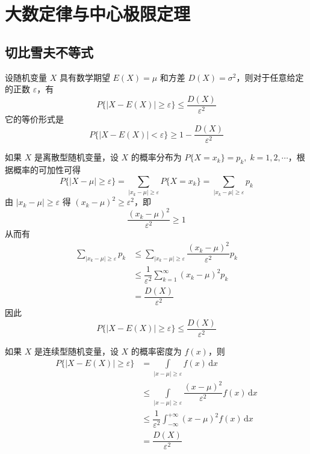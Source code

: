 
\chapter{大数定律与中心极限定理}

\section{切比雪夫不等式}

\begin{theorem}[（切比雪夫不等式）]
    设随机变量 $X$ 具有数学期望 $E(X)=\mu$ 和方差 $D(X) = \sigma^2$，则对于任意给定的正数 $\varepsilon$，有
    $$
    P\{ |X-E(X)| \geqslant \varepsilon \} \leqslant \dfrac{D(X)}{\varepsilon^2}
    $$
    它的等价形式是
    $$
    P\{ |X-E(X)| < \varepsilon \} \geqslant 1 - \dfrac{D(X)}{\varepsilon^2}
    $$
\end{theorem}

\begin{myproof}
    如果 $X$ 是离散型随机变量，设 $X$ 的概率分布为 $P\{X = x_k\} = p_k, \; k=1,2,\cdots$，根据概率的可加性可得
    $$
    P\{ |X-\mu| \geqslant \varepsilon \} = \sum_{|x_k-\mu| \geqslant \varepsilon} P\{ X=x_k \} = \sum_{|x_k-\mu| \geqslant \varepsilon} p_k
    $$
    由 $|x_k-\mu| \geqslant \varepsilon$ 得 $(x_k-\mu)^2 \geqslant \varepsilon^2$，即
    $$
    \dfrac{(x_k-\mu)^2}{\varepsilon^2} \geqslant 1
    $$
    从而有
    $$
    \begin{aligned}
        \sum_{|x_k-\mu| \geqslant \varepsilon} p_k & \leqslant \sum_{|x_k-\mu| \geqslant \varepsilon} \dfrac{(x_k-\mu)^2}{\varepsilon^2} p_k \\
        & \leqslant \dfrac{1}{\varepsilon^2} \sum_{k=1}^{\infty} (x_k-\mu)^2 p_k \\
        &= \dfrac{D(X)}{\varepsilon^2}
    \end{aligned}
    $$
    因此
    $$
    P\{ |X-E(X)| \geqslant \varepsilon \} \leqslant \dfrac{D(X)}{\varepsilon^2}
    $$

    如果 $X$ 是连续型随机变量，设 $X$ 的概率密度为 $f(x)$，则
    $$
    \begin{aligned}
        P\{ |X-E(X)| \geqslant \varepsilon \} &= \underset{|x-\mu| \geqslant \varepsilon}{\int} f(x) \, \text{d}x \\
         & \leqslant \underset{|x-\mu| \geqslant \varepsilon}{\int} \dfrac{(x-\mu)^2}{\varepsilon^2} f(x) \, \text{d}x \\
         & \leqslant \dfrac{1}{\varepsilon^2} \int_{-\infty}^{+\infty} (x-\mu)^2 f(x) \, \text{d}x \\
         &= \dfrac{D(X)}{\varepsilon^2}
    \end{aligned}
    $$
\end{myproof}

